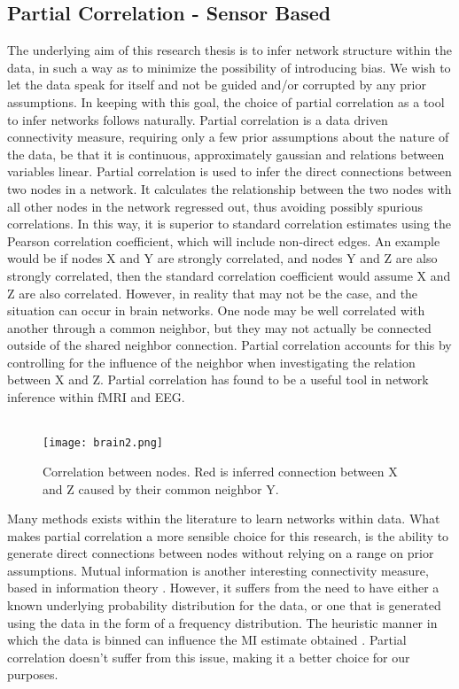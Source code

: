 \documentclass[11pt]{article}
\begin{document}
\subsection{Partial Correlation - Sensor Based}
The underlying aim of this research thesis is to infer network structure within the data, in such a way as to minimize the possibility of introducing bias. We wish to let the data speak for itself and not be guided and/or corrupted by any prior assumptions. In keeping with this goal, the choice of partial correlation as a tool to infer networks follows naturally. Partial correlation is a data driven connectivity measure, requiring only a few prior assumptions about the nature of the data, be that it is continuous, approximately gaussian and relations between variables linear. Partial correlation is used to infer the direct connections between two nodes in a network. It calculates the relationship between the two nodes with all other nodes in the network regressed out, thus avoiding possibly spurious correlations. In this way, it is superior to standard correlation estimates using the Pearson correlation coefficient, which will include non-direct edges. An example would be if nodes X and Y are strongly correlated, and nodes Y and Z are also strongly correlated, then the standard correlation coefficient would assume X and Z are also correlated. However, in reality that may not be the case, and the situation can occur in brain networks. One node may be well correlated with another through a common neighbor, but they may not actually be connected outside of the shared neighbor connection. Partial correlation accounts for this by controlling for the influence of the neighbor when investigating the relation between X and Z. Partial correlation has found to be a useful tool in network inference within fMRI and EEG.\\
\\
\begin{figure}%
\centering\texttt{[image: brain2.png]}%
\caption{Correlation between nodes. Red is inferred connection between X and Z caused by their common neighbor Y.}
\label{b2}
\end{figure} 
Many methods exists within the literature to learn networks within data. What makes partial correlation a more sensible choice for this research, is the ability to generate direct connections between nodes without relying on a range on prior assumptions. Mutual information is another interesting connectivity measure, based in information theory \citep{mackay}. However, it suffers from the need to have either a known underlying probability distribution for the data, or one that is generated using the data in the form of a frequency distribution. The heuristic manner in which the data is binned can influence the MI estimate obtained \citep{MIC1}. Partial correlation doesn't suffer from this issue, making it a better choice for our purposes.
\end{document}
